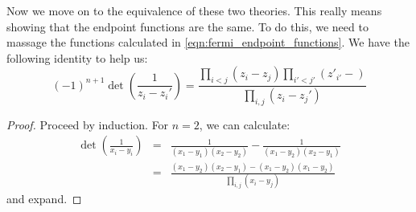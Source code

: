 \documentclass{booc}
\begin{document}
Now we move on to the equivalence of these two theories. 
This really means showing that the endpoint functions are the same.
To do this, we need to massage the functions calculated in \eqref{eqn:fermi_endpoint_functions}.
We have the following identity to help us:
\begin{equation}
\left( -1 \right)^{n+1}
\det\left( 
\frac{1}{z_i - z_i'}
\right)
=
\frac{
\prod_{i<j} \left( z_i - z_j \right)
\prod_{i' < j'} \left( z'_{i'} -  \right)
}{
\prod_{i,j} \left( z_i  - z_j' \right)
}
\end{equation}
\begin{proof}
Proceed by induction.
For $n= 2$,
we can calculate:
\begin{eqnarray}
\det\left( \frac{1}{x_i - y_i} \right) &=&  
\frac{1}{\left( x_1 - y_1 \right)\left( x_2 - y_2 \right)}
- 
\frac{1}{\left( x_1 - y_2 \right)\left( x_2 - y_1 \right)}
\\ &=& 
\frac{\left( x_1 - y_2 \right)\left( x_2 - y_1 \right) - 
\left( x_1 - y_2 \right)\left( x_1 - y_2 \right)}{\prod_{i,j}\left( x_i - y_j \right)}
\end{eqnarray}
and expand. 
\end{proof}
\end{document}
